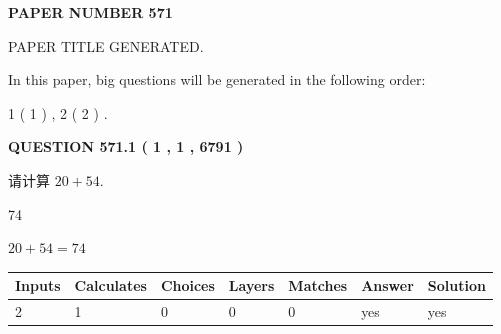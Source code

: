 \documentclass{ctexart}
\begin{document}
   
 {\textbf{ \Large{ PAPER NUMBER  571  }}}
   
   
\vspace{0.2in}
   
   
   
   
   
   
   
   
 \vspace{0.2in}
 
 
 
 
   
   
 PAPER TITLE GENERATED.
   
   
   
\vspace{0.2in}
   
In this paper, big questions will be generated in the following order: 
   
   
   1 ( 1 )
 ,
   2 ( 2 )
 .
  
\vspace{0.2in}
  
{\textbf{\Large{QUESTION
571.1 
 ( 1 , 1 , 6791 )
}}}
  
  
 
请计算 $ %
20 +  %
54 $.
 
 
 
\noindent{}
 
 

74
 
 
\noindent{}
 
 

 
 
 
\noindent{}
 
 

$ %
20 +  %
54=   %
74$
 
 
\noindent{}
 
 

 
   
   
   
   
\noindent\begin{tabular}{|l|l|l|l|l|l|l|}
 \hline
Inputs & Calculates & Choices & Layers & Matches & Answer & Solution \\ \hline
 2  & 
 1  & 
 0
  & 
 0  & 
 0  & 
  yes & 
  yes 
  \\ \hline
 \end{tabular}
   
\end{document}
